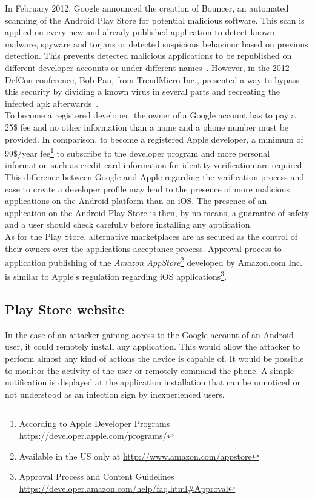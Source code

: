 In February 2012, Google announced the creation of Bouncer, an automated scanning of the Android Play Store for potential malicious software.
This scan is applied on every new and already published application to detect known malware, spyware and torjans or detected suspicious behaviour based on previous detection.
This prevents detected malicious applications to be republished on different developer accounts or under different names~\cite{secu-bouncer}.
However, in the 2012 DefCon conference, Bob Pan, from TrendMicro Inc., presented a way to bypass this security by dividing a known virus in several parts and recreating the infected apk afterwards~\cite{secu-defcon}.\\

To become a registered developer, the owner of a Google account has to pay a 25\$ fee and no other information than a name and a phone number must be provided.
In comparison, to become a registered Apple developer, a minimum of 99\$/year fee\footnote{According to Apple Developer Programs \url{https://developer.apple.com/programs/}} to subscribe to the developer program and more personal information such as credit card information for identity verification are required.\\

This difference between Google and Apple regarding the verification process and ease to create a developer profile  may lead to the presence of more malicious applications on the Android platform than on iOS.
The presence of an application on the Android Play Store is then, by no means, a guarantee of safety and a user should check carefully before installing any application.\\

As for the Play Store, alternative marketplaces are as secured as the control of their owners over the applications acceptance process.
Approval process to application publishing of the \emph{Amazon AppStore}\footnote{Available in the US only at \url{http://www.amazon.com/appstore}} developed by Amazon.com Inc. is  similar to Apple's regulation regarding iOS applications\footnote{Approval Process and Content Guidelines \url{https://developer.amazon.com/help/faq.html\#Approval}}.

\subsection{Play Store website}

In the case of an attacker gaining access to the Google account of an Android user, it could remotely install any application.
This would allow the attacker to perform almost any kind of actions the device is capable of.
It would be possible to monitor the activity of the user or remotely command the phone.
A simple notification is displayed at the application installation that can be unnoticed or not understood as an infection sign by inexperienced users.

